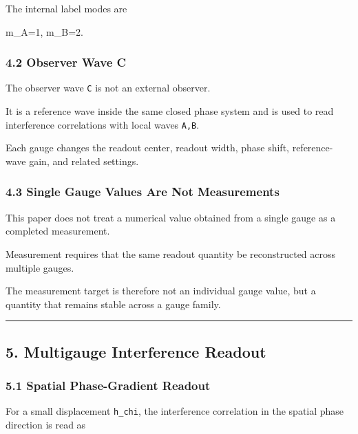 \documentclass[
  a4paper,
]{article}
\newenvironment{Shaded}{}{}
\newcommand{\NormalTok}[1]{#1}
\begin{document}
The internal label modes are

\begin{Shaded}
\begin{Highlighting}[]
\NormalTok{m\_A=1,}
\NormalTok{m\_B=2.}
\end{Highlighting}
\end{Shaded}

\subsubsection{4.2 Observer Wave C}\label{observer-wave-c}

The observer wave \texttt{C} is not an external observer.

It is a reference wave inside the same closed phase system and is used
to read interference correlations with local waves \texttt{A,B}.

Each gauge changes the readout center, readout width, phase shift,
reference-wave gain, and related settings.

\subsubsection{4.3 Single Gauge Values Are Not
Measurements}\label{single-gauge-values-are-not-measurements}

This paper does not treat a numerical value obtained from a single gauge
as a completed measurement.

Measurement requires that the same readout quantity be reconstructed
across multiple gauges.

The measurement target is therefore not an individual gauge value, but a
quantity that remains stable across a gauge family.

\begin{center}\rule{0.5\linewidth}{0.5pt}\end{center}

\subsection{5. Multigauge Interference
Readout}\label{multigauge-interference-readout}

\subsubsection{5.1 Spatial Phase-Gradient
Readout}\label{spatial-phase-gradient-readout}

For a small displacement \texttt{h\_chi}, the interference correlation
in the spatial phase direction is read as
\end{document}

